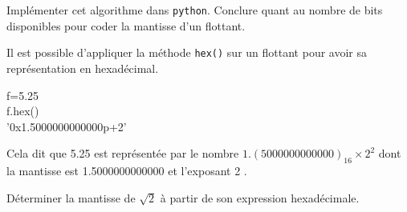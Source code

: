 \begin{qexo}
Implémenter cet algorithme dans \texttt{python}. Conclure quant au nombre de bits disponibles pour coder la mantisse d'un flottant.
\end{qexo}

Il est possible d'appliquer la méthode \texttt{hex()} sur un flottant pour avoir sa représentation en hexadécimal.

\begin{pythonshell}
\invite f=5.25\\
\invite f.hex()\\
’0x1.5000000000000p+2’
\end{pythonshell}

Cela dit que 5.25 est représentée par le nombre $1.(5000000000000)_{16} \times 2^{2}$
dont la mantisse est 1.5000000000000 et l'exposant 2
.

\begin{qexo}
Déterminer la mantisse de $\sqrt{2}$ à partir de son expression hexadécimale.
\end{qexo}

